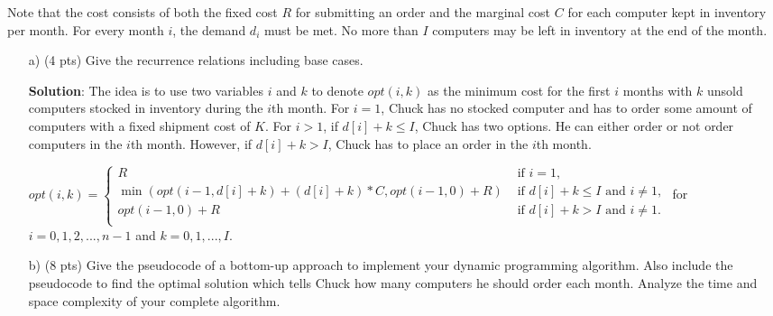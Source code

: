 \documentclass{article}
\begin{document}
Note that the cost consists of both the fixed cost $R$ for submitting an order and the marginal cost $C$ for each computer kept in inventory per month. For every month $i$, the demand $d_{i}$ must be met. No more than $I$ computers may be left in inventory at the end of the month. 

\begin{itemize}
\item[a)] (4 pts) Give the recurrence relations including base cases.
\begin{tcolorbox}
\textbf{Solution}: The idea is to use two variables $i$ and $k$ to denote $opt(i, k)$ as the minimum cost for the first $i$ months with $k$ unsold computers stocked in inventory during the $i$th month. For $i = 1$, Chuck has no stocked computer and has to order some amount of computers with a fixed shipment cost of $K$. For $i > 1$, if $d[i] + k \leq I$, Chuck has two options. He can either order or not order computers in the $i$th month. However, if $d[i] + k > I$, Chuck has to place an order in the $i$th month.

$opt(i,k) = \left\{ \begin{array}{rcl}
         R &\mbox{ if } i = 1, \\
         \min(opt(i-1, d[i] + k) + (d[i] + k)*C, opt(i-1, 0) + R) & \mbox{ if } d[i] + k \leq I \mbox{ and } i \neq 1,  \\
         opt(i-1, 0) + R  & \mbox{ if } d[i] + k > I \mbox{ and } i \neq 1. \\
                \end{array}\right.$
for $i = 0, 1, 2, ..., n -1$ and $k = 0, 1, ..., I$.
\end{tcolorbox}

\item[b)] (8 pts) Give the pseudocode of a bottom-up approach to implement your dynamic programming algorithm. Also include the  pseudocode to find the optimal solution which tells Chuck how many computers he should order each month. Analyze the time and space complexity of your complete algorithm.
\end{itemize}
\end{document}

